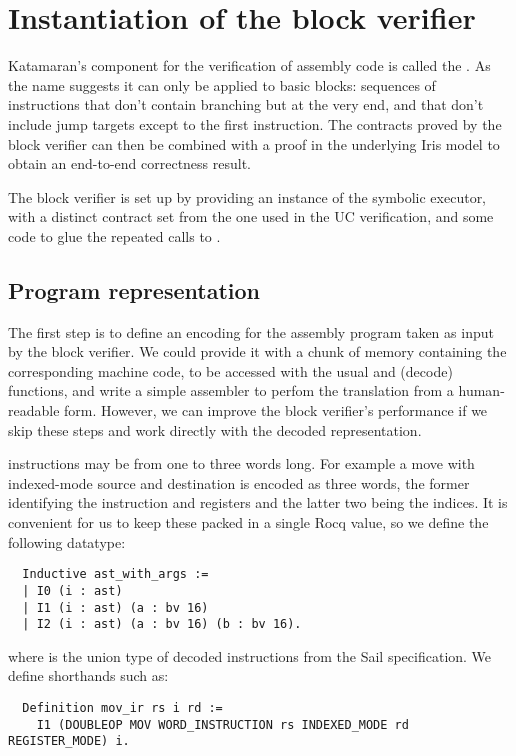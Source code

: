 \section{Instantiation of the block verifier}

Katamaran's component for the verification of assembly code is called the . As the name suggests it can only be applied to basic blocks: sequences of instructions that don't contain branching but at the very end, and that don't include jump targets except to the first instruction. The contracts proved by the block verifier can then be combined with a proof in the underlying Iris model to obtain an end-to-end correctness result.

The block verifier is set up by providing an instance of the symbolic executor,
with a distinct contract set from the one used in the UC verification, and some code to glue the repeated calls to .

\subsection{Program representation}
\label{sec:program-representation}

The first step is to define an encoding for the assembly program taken as input by the block verifier. We could provide it with a chunk of memory containing the corresponding machine code, to be accessed with the usual  and  (decode) functions, and write a simple assembler to perfom the translation from a human-readable form. However, we can improve the block verifier's performance if we skip these steps and work directly with the decoded representation.

\msp instructions may be from one to three words long. For example a move with indexed-mode source and destination is encoded as three words, the former identifying the instruction and registers and the latter two being the indices. It is convenient for us to keep these packed in a single Rocq value, so we define the following datatype:
\begin{verbatim}
  Inductive ast_with_args :=
  | I0 (i : ast)
  | I1 (i : ast) (a : bv 16)
  | I2 (i : ast) (a : bv 16) (b : bv 16).
\end{verbatim}
where  is the union type of decoded instructions from the Sail specification. We define shorthands such as:
\begin{verbatim}
  Definition mov_ir rs i rd :=
    I1 (DOUBLEOP MOV WORD_INSTRUCTION rs INDEXED_MODE rd REGISTER_MODE) i.
\end{verbatim}

